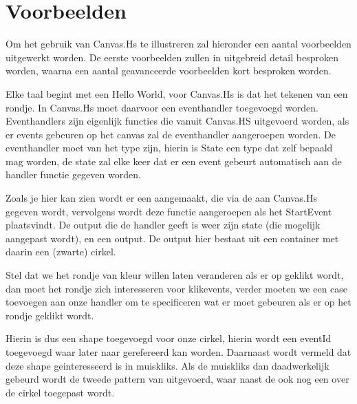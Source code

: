 \section{Voorbeelden}
Om het gebruik van Canvas.Hs te illustreren zal hieronder een aantal voorbeelden uitgewerkt worden. De eerste voorbeelden zullen in uitgebreid detail besproken worden, waarna een aantal geavanceerde voorbeelden kort besproken worden.

Elke taal begint met een Hello World, voor Canvas.Hs is dat het tekenen van een rondje. In Canvas.Hs moet daarvoor een eventhandler toegevoegd worden. Eventhandlers zijn eigenlijk functies die vanuit Canvas.HS uitgevoerd worden, als er events gebeuren op het canvas zal de eventhandler aangeroepen worden. De eventhandler moet van het type  zijn, hierin is State een type dat zelf bepaald mag worden, de state zal elke keer dat er een event gebeurt automatisch aan de handler functie gegeven worden.



Zoals je hier kan zien wordt er een  aangemaakt, die via de  aan Canvas.Hs gegeven wordt, vervolgens wordt deze functie aangeroepen als het StartEvent plaatsvindt. De output die de handler geeft is weer zijn state (die mogelijk aangepast wordt), en een output. De output hier bestaat uit een container met daarin een (zwarte) cirkel.

Stel dat we het rondje van kleur willen laten veranderen als er op geklikt wordt, dan moet het rondje zich interesseren voor klikevents, verder moeten we een case toevoegen aan onze handler om te specificeren wat er moet gebeuren als er op het rondje geklikt wordt.



Hierin is dus een  shape toegevoegd voor onze cirkel, hierin wordt een eventId toegevoegd waar later naar gerefereerd kan worden. Daarnaast wordt vermeld dat deze shape geinteresseerd is in muiskliks. Als de muiskliks dan daadwerkelijk gebeurd wordt de tweede pattern van  uitgevoerd, waar naast de  ook nog een  over de cirkel toegepast wordt.
